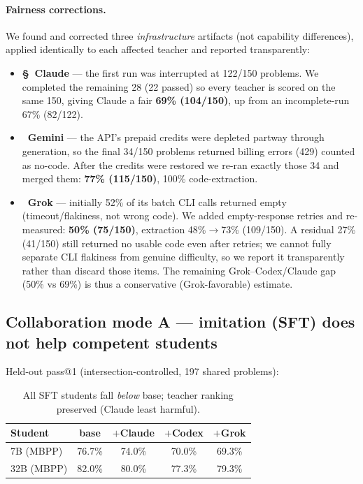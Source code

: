 \documentclass[11pt]{article}
\begin{document}
\paragraph{Fairness corrections.}
We found and corrected three \emph{infrastructure} artifacts (not capability differences), applied
identically to each affected teacher and reported transparently:
\begin{itemize}
  \item \textbf{\S\ Claude} --- the first run was interrupted at 122/150 problems. We completed the
    remaining 28 (22 passed) so every teacher is scored on the same 150, giving Claude a fair
    \textbf{69\% (104/150)}, up from an incomplete-run 67\% (82/122).
  \item \textbf{\ddag\ Gemini} --- the API's prepaid credits were depleted partway through
    generation, so the final 34/150 problems returned billing errors (429) counted as no-code.
    After the credits were restored we re-ran exactly those 34 and merged them:
    \textbf{77\% (115/150)}, 100\% code-extraction.
  \item \textbf{\dag\ Grok} --- initially 52\% of its batch CLI calls returned empty
    (timeout/flakiness, not wrong code). We added empty-response retries and re-measured:
    \textbf{50\% (75/150)}, extraction 48\%$\to$73\% (109/150). A residual 27\% (41/150) still
    returned no usable code even after retries; we cannot fully separate CLI flakiness from genuine
    difficulty, so we report it transparently rather than discard those items. The remaining
    Grok--Codex/Claude gap (50\% vs 69\%) is thus a conservative (Grok-favorable) estimate.
\end{itemize}

\subsection{Collaboration mode A --- imitation (SFT) does not help competent students}
Held-out pass@1 (intersection-controlled, 197 shared problems):
\begin{table}[h]\centering
\begin{tabular}{lcccc}
\toprule
Student & base & $+$Claude & $+$Codex & $+$Grok \\
\midrule
7B (MBPP)  & 76.7\% & 74.0\% & 70.0\% & 69.3\% \\
32B (MBPP) & 82.0\% & 80.0\% & 77.3\% & 79.3\% \\
\bottomrule
\end{tabular}
\caption{All SFT students fall \emph{below} base; teacher ranking preserved (Claude least
harmful).}
\end{table}
\end{document}
